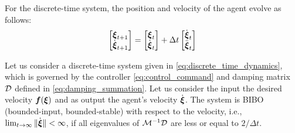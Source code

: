 For the discrete-time system, the position and velocity of the agent evolve as follows:
\begin{equation}
	\begin{bmatrix}
	 \vecs \xi_{t+1} \\ \dot{\vecs \xi}_{t+1}
	\end{bmatrix}
	=
	\begin{bmatrix}
	 \vecs \xi_{t} \\ \dot{\vecs \xi}_{t}
	\end{bmatrix}
	+ 
	\Delta t 
	\begin{bmatrix}
		\dot{\vecs \xi}_{t} \\ \ddot{\vecs \xi}_t 
	\end{bmatrix}
	\label{eq:discrete_time_dynamics}
\end{equation}

\begin{lemma}
	Let us consider a discrete-time system given in \eqref{eq:discrete_time_dynamics}, which is governed by the controller \eqref{eq:control_command} and damping matrix $\mathcal{D}$ defined in \eqref{eq:damping_summation}.
	Let us consider the input the desired velocity $\boldsymbol{f}(\boldsymbol{\xi})$ and as output the agent's velocity $\dot{\boldsymbol{\xi}}$. 
	The system is BIBO (bounded-input, bounded-stable) with respect to the velocity, i.e., $\lim_{t \rightarrow \infty} \| \dot{\boldsymbol{\xi}} \| < \infty$, if all eigenvalues of $\mathcal{M}^{-1} \mathcal{D}$ are less or equal to $2 / \Delta t$.
\end{lemma}

